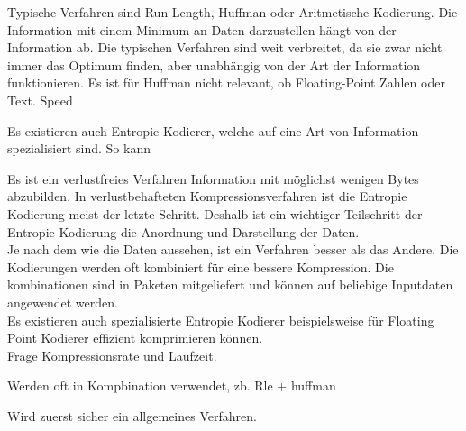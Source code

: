 Typische Verfahren sind Run Length, Huffman oder Aritmetische Kodierung. Die Information mit einem Minimum an Daten darzustellen hängt von der Information ab. Die typischen Verfahren sind weit verbreitet, da sie zwar nicht immer das Optimum finden, aber unabhängig von der Art der Information funktionieren. Es ist für Huffman nicht relevant, ob Floating-Point Zahlen oder Text. 
Speed

Es existieren auch Entropie Kodierer, welche auf eine Art von Information spezialisiert sind. So kann


 Es ist ein verlustfreies Verfahren Information mit möglichst wenigen Bytes abzubilden. In verlustbehafteten Kompressionsverfahren ist die Entropie Kodierung meist der letzte Schritt. Deshalb ist ein wichtiger Teilschritt der Entropie Kodierung die Anordnung und Darstellung der Daten.\\
Je nach dem wie die Daten aussehen, ist ein Verfahren besser als das Andere.  Die Kodierungen werden oft kombiniert für eine bessere Kompression. Die kombinationen sind in Paketen mitgeliefert und können auf beliebige Inputdaten angewendet werden.\\

Es existieren auch spezialisierte Entropie Kodierer beispielsweise für Floating Point Kodierer \cite{ratanaworabhan2006fast} effizient komprimieren können.\\
Frage Kompressionsrate und Laufzeit.

Werden oft in Kompbination verwendet, zb. Rle + huffman

Wird zuerst sicher ein allgemeines Verfahren.